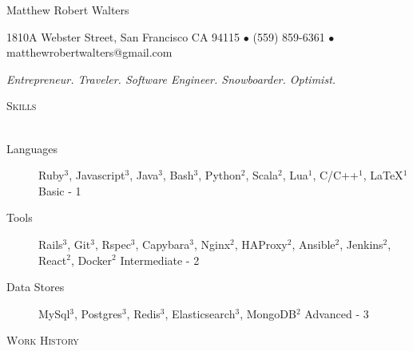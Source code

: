 \documentclass{article}
\newcommand{\lineunder}{\vspace*{-8pt} \\ \hspace*{-18pt} \hrulefill \\}
\newcommand{\header}[1]{{\hspace*{-15pt}\vspace*{6pt} \textsc{#1}} \vspace*{-6pt} \lineunder}
\begin{document}
\small
\smallskip
\vspace*{-44pt}


\begin{center}
 
\huge Matthew Robert Walters 
\linebreak
\normalsize

{1810A Webster Street, San Francisco CA 94115 $\bullet$ (559) 859-6361 $\bullet$ matthewrobertwalters@gmail.com} \newline


 \textit{Entrepreneur. Traveler. Software Engineer. Snowboarder. Optimist.}
\end{center}

\small

\header{Skills}

\begin{description}

\item[Languages] Ruby$^3$, Javascript$^3$, Java$^3$, Bash$^3$, Python$^2$, Scala$^2$, Lua$^1$, C/C++$^1$, \LaTeX$^1$             \hfill Basic - 1

\item[Tools] Rails$^3$, Git$^3$, Rspec$^3$, Capybara$^3$, Nginx$^2$, HAProxy$^2$, Ansible$^2$, Jenkins$^2$, React$^2$, Docker$^2$     \hfill Intermediate - 2	
			                                            
\item[Data Stores] MySql$^3$, Postgres$^3$, Redis$^3$, Elasticsearch$^3$, MongoDB$^2$                                                       \hfill Advanced - 3

\end{description}

\header{Work History}
\end{document}
